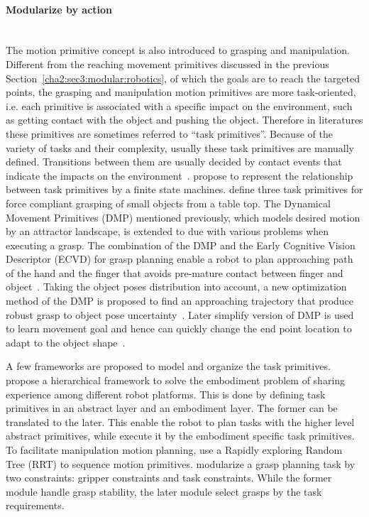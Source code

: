 \paragraph{Modularize by action}
~\\
The motion primitive concept is also introduced to grasping and manipulation. Different from the reaching movement primitives discussed in the previous Section~\ref{cha2:sec3:modular:robotics}, of which the goals are to reach the targeted points, the grasping and manipulation motion primitives are more task-oriented, i.e. each primitive is associated with a specific impact on the environment, such as getting contact with the object and pushing the object. Therefore in literatures these primitives are sometimes referred to ``task primitives''. Because of the variety of tasks and their complexity, usually these task primitives are manually defined. Transitions between them are usually decided by contact events that indicate the impacts on the environment~\citep{morrow1997manipulation}. \citet{michelman1994forming} propose to represent the relationship between task primitives by a finite state machines. \citet{kazemi2012robust} define three task primitives for force compliant grasping of small objects from a table top. The Dynamical Movement Primitives (DMP) mentioned previously, which models desired motion by an attractor landscape, is extended to due with various problems when executing a grasp. The combination of the DMP and the Early Cognitive Vision Descriptor (ECVD) for grasp planning enable a robot to plan approaching path of the hand and the finger that avoids pre-mature contact between finger and object~\citep{kroemer2011grasping}. Taking the object poses distribution into account, a new optimization method of the DMP is proposed to find an approaching trajectory that produce robust grasp to object pose uncertainty~\citep{stulp2011learning}. Later simplify version of DMP is used to learn movement goal and hence can quickly change the end point location to adapt to the object shape~\citep{stulp2011learning,stulp2012reinforcement}.

A few frameworks are proposed to model and organize the task primitives. \citet{laaksonen2010embodiment,felip2013manipulation} propose a hierarchical framework to solve the embodiment problem of sharing experience among different robot platforms. This is done by defining task primitives in an abstract layer and an embodiment layer. The former can be translated to the later. This enable the robot to plan tasks with the higher level abstract primitives, while execute it by the embodiment specific task primitives. To facilitate manipulation motion planning, \citet{barry2013manipulation} use a Rapidly exploring Random Tree (RRT) to sequence motion primitives. \citet{detry2013generalizing} modularize a grasp planning task by two constraints: gripper constraints and task constraints. While the former module handle grasp stability, the later module select grasps by the task requirements.


